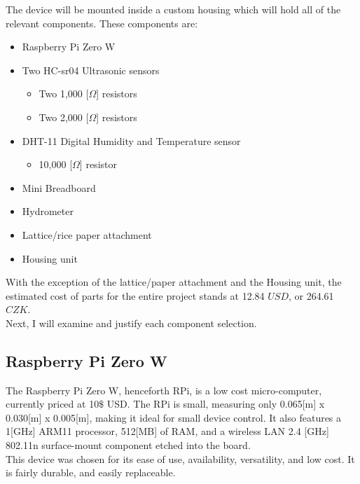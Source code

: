 \documentclass[twoside]{ctuthesis}
\theoremstyle{plain}
\theoremstyle{definition}
\theoremstyle{note}
\begin{document}
The device will be mounted inside a custom housing which will hold all of the relevant components. These components are:

\begin{itemize}
	\item Raspberry Pi Zero W
	\item Two HC-sr04 Ultrasonic sensors
	\begin{itemize}
		\item Two 1,000 [$\Omega$] resistors
		\item Two 2,000 [$\Omega$] resistors
	\end{itemize}
	\item DHT-11 Digital Humidity and Temperature sensor
	\begin{itemize}
		\item 10,000 [$\Omega$] resistor
	\end{itemize}
	\item Mini Breadboard
	\item Hydrometer
	\item Lattice/rice paper attachment
	\item Housing unit
\end{itemize}

With the exception of the lattice/paper attachment and the Housing unit, the estimated cost of parts for the entire project stands at 12.84 $USD$, or 264.61 $CZK$.\\
Next, I will examine and justify each component selection.

\subsection{Raspberry Pi Zero W}
The Raspberry Pi Zero W, henceforth RPi, is a low cost micro-computer, currently priced at 10$\$$ USD. The RPi is small, measuring only 0.065[m] x 0.030[m] x 0.005[m], making it ideal for small device control. It also features a 1[GHz] ARM11 processor, 512[MB] of RAM, and a wireless LAN 2.4 [GHz] 802.11n surface-mount component etched into the board.\\
This device was chosen for its ease of use, availability, versatility, and low cost. It is fairly durable, and easily replaceable.
\end{document}
